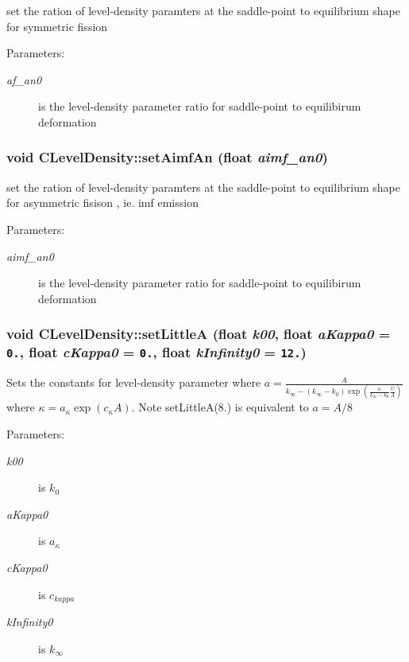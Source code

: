set the ration of level-density paramters at the saddle-point to equilibrium shape for symmetric fission \begin{Desc}
\item[Parameters:]
\begin{description}
\item[{\em af\_\-an0}]is the level-density parameter ratio for saddle-point to equilibirum deformation \end{description}
\end{Desc}
\subsubsection{\setlength{\rightskip}{0pt plus 5cm}void CLevel\-Density::set\-Aimf\-An (float {\em aimf\_\-an0})\hspace{0.3cm}{\tt  [static]}}\label{classCLevelDensity_038598d13bb39c8a2cec9c54549284e8}


set the ration of level-density paramters at the saddle-point to equilibrium shape for asymmetric fisison , ie. imf emission \begin{Desc}
\item[Parameters:]
\begin{description}
\item[{\em aimf\_\-an0}]is the level-density parameter ratio for saddle-point to equilibirum deformation \end{description}
\end{Desc}
\subsubsection{\setlength{\rightskip}{0pt plus 5cm}void CLevel\-Density::set\-Little\-A (float {\em k00}, float {\em a\-Kappa0} = {\tt 0.}, float {\em c\-Kappa0} = {\tt 0.}, float {\em k\-Infinity0} = {\tt 12.})\hspace{0.3cm}{\tt  [static]}}\label{classCLevelDensity_f92ce917d4fc2c1c57bed9cf904c1da4}


Sets the constants for level-density parameter where $a=\frac{A}{k_{\infty} - \left(k_{\infty} -k_{0} \right) \exp\left( \frac{\kappa}{k_{\infty}-k_{0}}\frac{U}{A}\right)}$ where $ \kappa = a_{\kappa} \exp\left(c_{\kappa} A\right) $. Note set\-Little\-A(8.) is equivalent to $a=A/8$ \begin{Desc}
\item[Parameters:]
\begin{description}
\item[{\em k00}]is $k_{0}$ \item[{\em a\-Kappa0}]is $a_{\kappa}$ \item[{\em c\-Kappa0}]is $c_{kappa}$ \item[{\em k\-Infinity0}]is $k_{\infty}$ \end{description}
\end{Desc}
